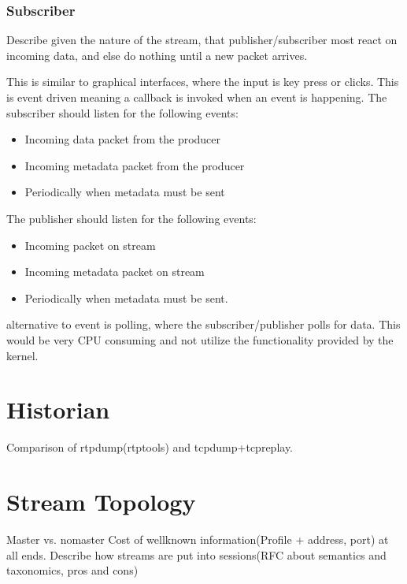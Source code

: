 \subsubsection{Subscriber}

Describe given the nature of the stream, that publisher/subscriber most react on incoming data, and else do nothing until a new packet arrives.

This is similar to graphical interfaces, where the input is key press or clicks. This is event driven meaning a callback is invoked when an event is happening.
The subscriber should listen for the following events:
\begin{itemize}
	\item Incoming data packet from the producer
	\item Incoming metadata packet from the producer
	\item Periodically when metadata must be sent
\end{itemize}

The publisher should listen for the following events:
\begin{itemize}
	\item Incoming packet on stream
	\item Incoming metadata packet on stream
	\item Periodically when metadata must be sent.
\end{itemize}

alternative to event is polling, where the subscriber/publisher polls for data. This would be very CPU consuming and not utilize the functionality provided by the kernel.


\section{Historian}

Comparison of rtpdump(rtptools) and tcpdump+tcpreplay.

\begin{table}[H]
\centering
{}
\caption{My caption}
\label{my-label}
\end{table}
\section{Stream Topology}

Master vs. nomaster
Cost of wellknown information(Profile + address, port) at all ends.
Describe how streams are put into sessions(RFC about semantics and taxonomics, pros and cons)

